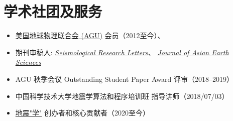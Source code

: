 \section{学术社团及服务}

\begin{itemize}
\item \href{https://sites.agu.org/}{美国地球物理联合会 (AGU)} 会员（2012至今）、
\item 期刊审稿人:
      \textit{\href{https://pubs.geoscienceworld.org/srl/}{Seismological Research Letters}}、
      \textit{\href{https://www.journals.elsevier.com/journal-of-asian-earth-sciences/}{Journal of Asian Earth Sciences}}
\item AGU 秋季会议 Outstanding Student Paper Award 评审（2018--2019）
\item 中国科学技术大学地震学算法和程序培训班 指导讲师（2018/07/03）
\item \href{https://seismo-learn.org/}{地震"学"} 创办者和核心贡献者（2020至今）
\end{itemize}
